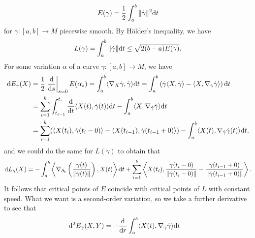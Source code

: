\[
E(\gamma )=\frac{1}{2}\int_a^b\Vert\dot{\gamma }\Vert^2\mathrm{d} t
\]
for $\gamma\colon [a,b]\to M$ piecewise smooth. By Hölder's inequality, we have
\[
L(\gamma )=\int_a^b\Vert\dot{\gamma }\Vert\mathrm{d} t\leq\sqrt{2(b-a) E(\gamma )}.
\]
For some variation $\alpha $ of a curve $\gamma\colon [a,b]\to M$, we have
\begin{align*}
    \mathrm{d} E_{\gamma } (X)&=\frac{1}{2}\left.\frac{\mathrm{d} }{\mathrm{d} s}\right\vert_{s=0} E(\alpha_s )=\int_a^b\langle\nabla_X\dot{\gamma },\dot{\gamma }\rangle\mathrm{d} t=\int_a^b\left(\dot{\gamma }\langle X,\dot{\gamma }\rangle -\langle X,\nabla_{\dot{\gamma } }\dot{\gamma }\rangle\right)\mathrm{d} t\\
    &=\sum_{i=1}^k\int_{t_{i-1} }^{t_i }\frac{\mathrm{d} }{\mathrm{d} t}\langle X(t),\dot{\gamma } (t)\rangle\mathrm{d} t-\int_a^b\langle X,\nabla_{\dot{\gamma } }\dot{\gamma }\rangle\mathrm{d} t\\
    &=\sum_{i=1}^k (\langle X(t_i ),\dot{\gamma } (t_i-0)\rangle -\langle X(t_{i-1} ) ,\dot{\gamma } (t_{i-1} +0)\rangle )-\int_a^b\langle X(t),\nabla_{\dot{\gamma } }\dot{\gamma } (t)\rangle\mathrm{d} t,
\end{align*}
and we could do the same for $L(\gamma )$ to obtain that
\[
\mathrm{d} L_{\gamma } (X)=-\int_a^b\left\langle\nabla_{\partial_t }\left(\frac{\dot{\gamma } (t)}{\Vert\dot{\gamma } (t)\Vert }\right) ,X(t)\right\rangle\mathrm{d} t+\sum_{i=1}^k\left\langle X(t_i ),\frac{\dot{\gamma } (t_i -0)}{\Vert\dot{\gamma } (t_i -0)\Vert } -\frac{\dot{\gamma } (t_{i-1} +0)}{\Vert\dot{\gamma } (t_{i-1} +0)\Vert }\right\rangle .
\]
It follows that critical points of $E$ coincide with critical points of $L$ with constant speed. What we want is a second-order variation, so we take a further derivative to see that
\begin{align*}
    \mathrm{d}^2E_{\gamma } (X,Y)&=-\frac{\mathrm{d} }{\mathrm{d} r}\int_a^b\langle X(t),\nabla_{\dot{\gamma } }\dot{\gamma }\rangle\mathrm{d} t
\end{align*}